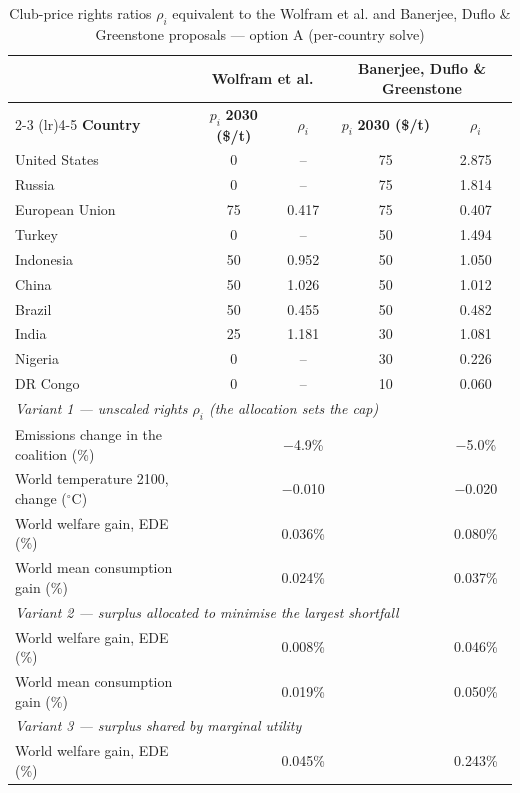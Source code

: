 \begin{table}[htbp]
\centering
\small
\caption{Club-price rights ratios $\rho_i$ equivalent to the Wolfram et al. and Banerjee, Duflo \& Greenstone proposals --- option A (per-country solve)}
\renewcommand{\arraystretch}{1.15}
\begin{tabular}{lcccc}
  \toprule
  & \multicolumn{2}{c}{\textbf{Wolfram et al.}} & \multicolumn{2}{c}{\textbf{Banerjee, Duflo \& Greenstone}} \\
  \cmidrule(lr){2-3} \cmidrule(lr){4-5}
  \textbf{Country} & $p_i$ \textbf{2030 (\$/t)} & $\rho_i$ & $p_i$ \textbf{2030 (\$/t)} & $\rho_i$ \\
  \midrule
  United States & 0 & -- & 75 & 2.875 \\
  Russia & 0 & -- & 75 & 1.814 \\
  European Union & 75 & 0.417 & 75 & 0.407 \\
  Turkey & 0 & -- & 50 & 1.494 \\
  Indonesia & 50 & 0.952 & 50 & 1.050 \\
  China & 50 & 1.026 & 50 & 1.012 \\
  Brazil & 50 & 0.455 & 50 & 0.482 \\
  India & 25 & 1.181 & 30 & 1.081 \\
  Nigeria & 0 & -- & 30 & 0.226 \\
  DR Congo & 0 & -- & 10 & 0.060 \\
  \midrule
  \multicolumn{5}{l}{\textit{Variant 1 --- unscaled rights $\rho_i$ (the allocation sets the cap)}} \\
  \quad Emissions change in the coalition (\%) &  & $-$4.9\% &  & $-$5.0\% \\
  \quad World temperature 2100, change ($^\circ$C) &  & $-$0.010 &  & $-$0.020 \\
  \quad World welfare gain, EDE (\%) &  & 0.036\% &  & 0.080\% \\
  \quad World mean consumption gain (\%) &  & 0.024\% &  & 0.037\% \\
  \midrule
  \multicolumn{5}{l}{\textit{Variant 2 --- surplus allocated to minimise the largest shortfall}} \\
  \quad World welfare gain, EDE (\%) &  & 0.008\% &  & 0.046\% \\
  \quad World mean consumption gain (\%) &  & 0.019\% &  & 0.050\% \\
  \midrule
  \multicolumn{5}{l}{\textit{Variant 3 --- surplus shared by marginal utility}} \\
  \quad World welfare gain, EDE (\%) &  & 0.045\% &  & 0.243\% \\

\end{tabular}
\end{table}
